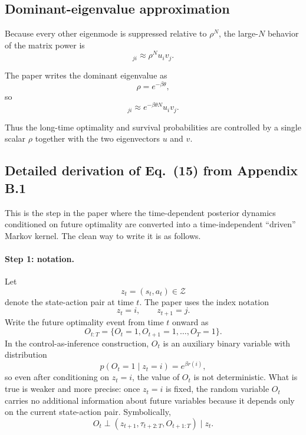 \documentclass[11pt]{article}
\begin{document}
\subsection*{Dominant-eigenvalue approximation}

Because every other eigenmode is suppressed relative to \(\rho^N\), the large-\(N\) behavior
of the matrix power is
\begin{equation}
    [\widetilde{P}^{N}]_{ji}
    \approx
    \rho^N u_i v_j.
\end{equation}

The paper writes the dominant eigenvalue as
\begin{equation}
    \rho=e^{-\beta\theta},
\end{equation}
so
\begin{equation}
    [\widetilde{P}^{N}]_{ji}
    \approx
    e^{-\beta\theta N}u_i v_j.
\end{equation}

Thus the long-time optimality and survival probabilities are controlled by a single scalar
\(\rho\) together with the two eigenvectors \(u\) and \(v\).

\subsection*{Detailed derivation of Eq.~(15) from Appendix B.1}

This is the step in the paper where the time-dependent posterior dynamics conditioned on
future optimality are converted into a time-independent ``driven'' Markov kernel. The clean
way to write it is as follows.

\paragraph{Step 1: notation.}
Let
\begin{equation}
    z_t=(s_t,a_t)\in\mathcal{Z}
\end{equation}
denote the state-action pair at time \(t\). The paper uses the index notation
\begin{equation}
    z_t=i,
    \qquad
    z_{t+1}=j.
\end{equation}
Write the future optimality event from time \(t\) onward as
\begin{equation}
    O_{t:T}=\{O_t=1,O_{t+1}=1,\dots,O_T=1\}.
\end{equation}
In the control-as-inference construction, \(O_t\) is an auxiliary binary variable with
distribution
\begin{equation}
    p(O_t=1\mid z_t=i)=e^{\beta r(i)},
\end{equation}
so even after conditioning on \(z_t=i\), the value of \(O_t\) is not deterministic. What is
true is weaker and more precise: once \(z_t=i\) is fixed, the random variable \(O_t\) carries
no additional information about future variables because it depends only on the current
state-action pair. Symbolically,
\begin{equation}
    O_t \perp (z_{t+1},\tau_{t+2:T},O_{t+1:T}) \mid z_t .
\end{equation}
\end{document}
